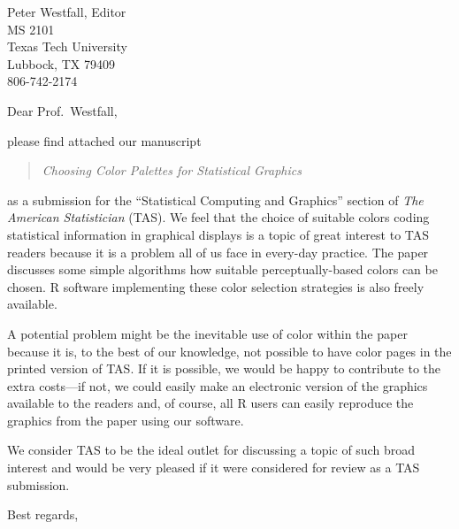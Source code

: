 \documentclass{wuletter}
\begin{document}
\begin{letter}{
Peter Westfall, Editor\\
MS 2101\\
Texas Tech University\\
Lubbock, TX  79409\\
806-742-2174}


\opening{Dear Prof.~Westfall,}

please find attached our manuscript
\begin{quote}
\textit{Choosing Color Palettes for Statistical Graphics}
\end{quote}
as a submission for the ``Statistical Computing and Graphics''
section of \emph{The American Statistician} (TAS). We feel that the
choice of suitable colors coding statistical information in
graphical displays is a topic of great interest to TAS
readers because it is a problem all of us face in every-day
practice. The paper discusses some simple algorithms how 
suitable perceptually-based colors can be chosen. \textsf{R}
software implementing these color selection strategies is
also freely available.

A potential problem might be the inevitable use of color 
within the paper because it is, to the best of our knowledge,
not possible to have color pages in the printed version of TAS.
If it is possible, we would be happy to contribute to the extra
costs---if not, we could easily make an electronic version of
the graphics available to the readers and, of course, all \textsf{R}
users can easily reproduce the graphics from the paper using our
software.

We consider TAS to be the ideal outlet for discussing a topic of
such broad interest and would be very pleased if it were considered
for review as a TAS submission.

\closing{Best regards,}
\end{letter}
\end{document}
